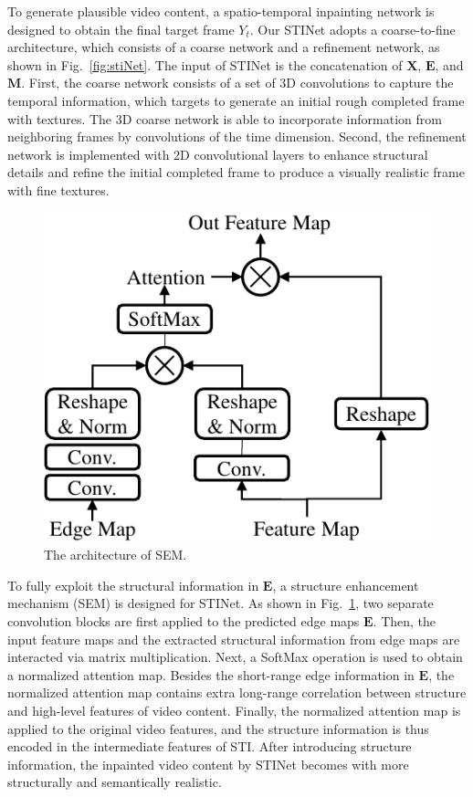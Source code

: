 To generate plausible video content, a spatio-temporal inpainting network  is designed to obtain the final target frame $Y_t$.
Our STINet adopts a coarse-to-fine architecture, which consists of a coarse network and a refinement network, as shown in Fig.~\ref{fig:stiNet}.
%
The input of STINet is the concatenation of $\boldsymbol{X}$, $\boldsymbol{E}$, and $\boldsymbol{M}$.
First, the coarse network consists of a set of 3D convolutions to capture the temporal information, which targets to generate an initial rough completed frame with textures. 
The 3D coarse network is able to incorporate information from neighboring frames by convolutions of the time dimension.
Second, the refinement network is implemented with 2D convolutional layers to enhance structural details and refine the initial completed frame to produce a visually realistic frame with fine textures.

\begin{figure}[t]
	\centering
	\includegraphics[width=0.65\columnwidth]{SEM} %
	\caption{The architecture of SEM.}
	\label{SEM}
\end{figure}

To fully exploit the structural information in $\boldsymbol{E}$, a structure enhancement mechanism (SEM) is designed for STINet.
As shown in Fig.~\ref{SEM}, two separate convolution blocks are first applied to the predicted edge maps $\boldsymbol{E}$.
Then, the input feature maps and the extracted structural information from edge maps are interacted via matrix multiplication. 
%
Next, a SoftMax operation is used to obtain a normalized attention map.
%
Besides the short-range edge information in $\boldsymbol{E}$, the normalized attention map contains extra long-range correlation between structure and high-level features of video content.
Finally, the normalized attention map is applied to the original video features, and the structure information is thus encoded in the intermediate features of STI.
After introducing structure information, the inpainted video content by STINet becomes with more structurally and semantically realistic.



